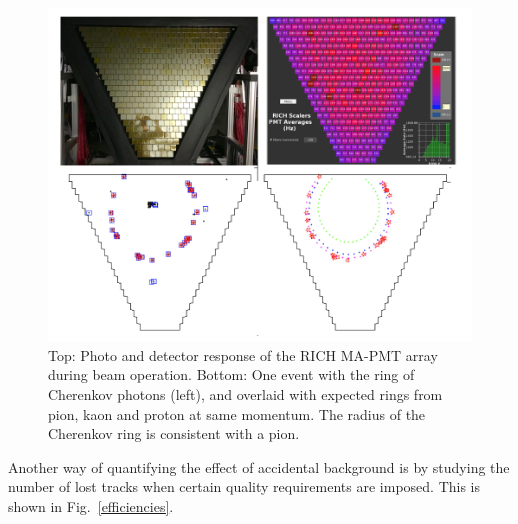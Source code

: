 \documentclass[final,3p,times,twocolumn,authoryear]{elsarticle}
\begin{document}
\vfill
\begin{figure}[htbp!]
\centerline{\includegraphics[width=1.0\columnwidth]{rich-event.png}}
\caption{\rm  Top: Photo and detector response of the RICH MA-PMT array during beam operation. 
Bottom: One event with the ring of Cherenkov photons (left), and overlaid with expected rings from 
pion, kaon and proton at same momentum. The radius of the Cherenkov ring  is consistent with a pion.  }
\label{rich-event}
\end{figure}

\noindent Another way of quantifying the effect of accidental background is by studying the number of lost tracks when certain quality requirements are imposed. This is shown in Fig.~\ref{efficiencies}.  
\end{document}

